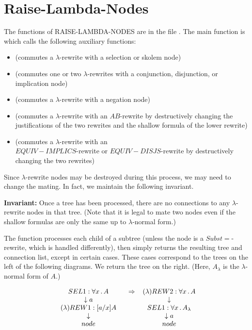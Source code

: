 \section{Raise-Lambda-Nodes}\label{raise-lambda-nodes}

The functions of RAISE-LAMBDA-NODES are in the
file {\it{}}.  The
main function is 
which calls the following auxiliary functions:
\begin{itemize}
\item {} (commutes a $\lambda$-rewrite with
a selection or skolem node)
\item {} (commutes one or two $\lambda$-rewrites with a conjunction,
disjunction, or implication node)
\item {} (commutes a $\lambda$-rewrite with a negation node)
\item {}  (commutes a $\lambda$-rewrite with an $AB$-rewrite
by destructively changing the justifications of the two rewrites and the shallow formula
of the lower rewrite)
\item {}  (commutes a $\lambda$-rewrite with an \\
$EQUIV-IMPLICS$-rewrite
or $EQUIV-DISJS$-rewrite by destructively changing the two rewrites)
\end{itemize}

Since $\lambda$-rewrite nodes may be destroyed during this process,
we may need to change the mating.  In fact, we maintain the
following invariant.

{\bf Invariant:}  Once a tree has been processed, there are no
connections to any $\lambda$-rewrite nodes in that tree.
(Note that it is legal to mate two nodes even if the shallow formulas
are only the same up to $\lambda$-normal form.)

The function  processes each
child of a subtree (unless the node is a $Subst=$-rewrite, which is handled differently),
then simply returns the resulting tree and
connection list, except in certain cases.
These cases correspond
to the trees on the left of the following diagrams.  We return
the tree on the right.  (Here, $A_\lambda$ is the $\lambda$-normal form of $A$.)

$${{\begin{array}[t]{c}SEL1: \forall x \, . \, A \\ \begin{array}[t]{c} \downarrow a \\ {{\begin{array}[t]{c}(\lambda)REW1: [a/x]A \\ \begin{array}[t]{c} \downarrow \\ node\end{array}\end{array}}}\end{array}\end{array}}} \Rightarrow 
{{\begin{array}[t]{c}(\lambda)REW2: \forall x \, . \, A \\ \begin{array}[t]{c} \downarrow \\ {{\begin{array}[t]{c}SEL1: \forall x \, . \, A_\lambda \\ \begin{array}[t]{c} \downarrow a \\ node\end{array}\end{array}}}\end{array}\end{array}}}$$

